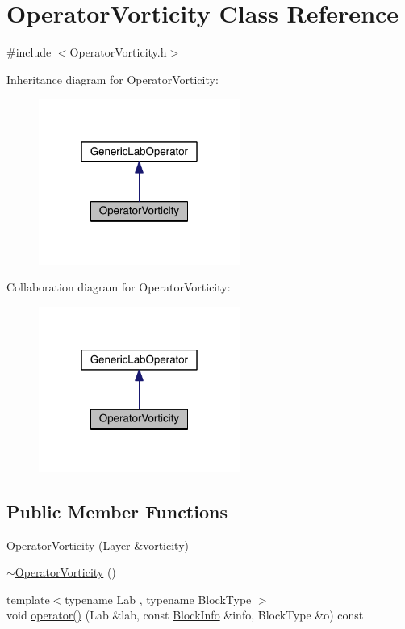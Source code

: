 \hypertarget{class_operator_vorticity}{}\section{Operator\+Vorticity Class Reference}
\label{class_operator_vorticity}


{\ttfamily \#include $<$Operator\+Vorticity.\+h$>$}



Inheritance diagram for Operator\+Vorticity\+:\nopagebreak
\begin{figure}[H]
\begin{center}
\leavevmode
\includegraphics[width=187pt]{d6/d9d/class_operator_vorticity__inherit__graph}
\end{center}
\end{figure}


Collaboration diagram for Operator\+Vorticity\+:\nopagebreak
\begin{figure}[H]
\begin{center}
\leavevmode
\includegraphics[width=187pt]{de/d01/class_operator_vorticity__coll__graph}
\end{center}
\end{figure}
\subsection*{Public Member Functions}
\begin{DoxyCompactItemize}
\item 
\hyperlink{class_operator_vorticity_a5f119e3cd343868bce48c0c46865854c}{Operator\+Vorticity} (\hyperlink{struct_layer}{Layer} \&vorticity)
\item 
\hyperlink{class_operator_vorticity_af42ecc8472869fd7ae95d1506f29f39d}{$\sim$\+Operator\+Vorticity} ()
\item 
{\footnotesize template$<$typename Lab , typename Block\+Type $>$ }\\void \hyperlink{class_operator_vorticity_a3e677de987ab03e9a31a6978fd46b512}{operator()} (Lab \&lab, const \hyperlink{struct_block_info}{Block\+Info} \&info, Block\+Type \&o) const 
\end{DoxyCompactItemize}
